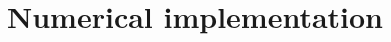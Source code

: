 \documentclass[
pra%
,preprint%
,amssymb, nobibnotes, aps, superscriptaddress, floatfix]{revtex4}
\renewcommand{\imath}{\mathrm{i}}
\newcommand{\rv}{\mathbf{r}}
\newcommand{\av}{\boldsymbol{\alpha}}
\newcommand{\kv}{\mathbf{k}}
\newcommand{\khsub}{\mathrm{KH}}
\begin{document}
%
%

\section{Numerical implementation} \label{sec:num}
\end{document}
